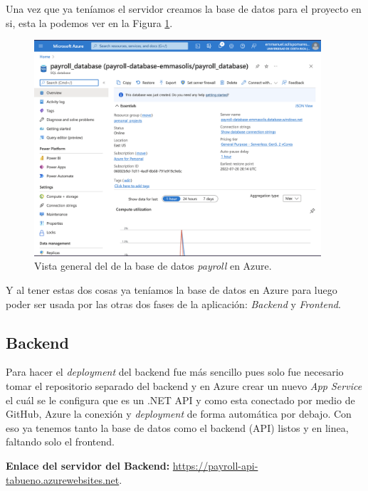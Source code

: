 \documentclass{article}
\begin{document}
Una vez que ya teníamos el servidor creamos la base de datos para el proyecto en si,
esta la podemos ver en la Figura \ref{fig:payroll_database}.

\begin{figure}[h]
  \centering
  \includegraphics[width=0.95\textwidth]{payroll_database.png}
  \caption{Vista general del de la base de datos \textit{payroll} en Azure.}
  \label{fig:payroll_database}
 \end{figure}

Y al tener estas dos cosas ya teníamos la base de datos en Azure para luego poder ser usada
por las otras dos fases de la aplicación: \textit{Backend} y \textit{Frontend}.

\subsection{Backend}
Para hacer el \textit{deployment} del backend fue más sencillo pues solo fue necesario
tomar el repositorio separado del backend y en Azure crear un nuevo \textit{App Service}
el cuál se le configura que es un .NET API y como esta conectado por medio de GitHub, Azure
la conexión y \textit{deployment} de forma automática por debajo. Con eso ya tenemos
tanto la base de datos como el backend (API) listos y en linea, faltando solo el frontend.

\textbf{Enlace del servidor del Backend:} \href{https://payroll-api-tabueno.azurewebsites.net}{https://payroll-api-tabueno.azurewebsites.net}.
\end{document}
